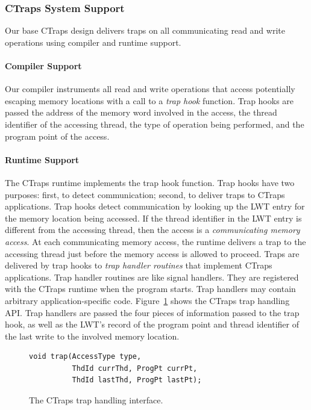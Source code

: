 \documentclass[preprint,9pt]{sigplanconf}
\newcommand{\ctraps}{CTraps\xspace}
\newcommand{\lwt}{LWT\xspace}
\begin{document}
\subsubsection{\ctraps System Support} 

Our base \ctraps design delivers traps on all communicating read and write
operations using compiler and runtime support. 

\paragraph{Compiler Support}
Our compiler instruments all read and write operations that access potentially
escaping memory locations with a call to a {\em trap hook} function.  Trap hooks
are passed the address of the memory word involved in the access, the thread
identifier of the accessing thread, the type of operation being performed, and
the program point of the access.  

\paragraph{Runtime Support}
The \ctraps runtime implements the trap hook function.  Trap hooks have two
purposes: first, to detect communication; second, to deliver traps to \ctraps
applications.  Trap hooks detect communication by looking up the \lwt entry for
the memory location being accessed.  If the thread identifier in the \lwt entry is
different from the accessing thread, then the access is a {\em communicating
memory access}.  At each communicating memory access, the runtime delivers a
trap to the accessing thread just before the memory access is allowed to
proceed.  Traps are delivered by trap hooks to {\em trap handler routines} that
implement \ctraps applications.  Trap handler routines are like signal
handlers.  They are registered with the \ctraps runtime when the program
starts.  Trap handlers may contain arbitrary application-specific code.
Figure~\ref{fig:hookapi} shows the \ctraps trap handling API.  Trap
handlers are passed the four pieces of information passed to the trap hook, as
well as the \lwt's record of the program point and thread identifier of the
last write to the involved memory location.

\begin{figure}[htb]
\centering
\begin{verbatim}
void trap(AccessType type, 
          ThdId currThd, ProgPt currPt,
          ThdId lastThd, ProgPt lastPt);
\end{verbatim}
\caption{\label{fig:hookapi}The \ctraps trap handling interface.}
\end{figure}
\end{document}
